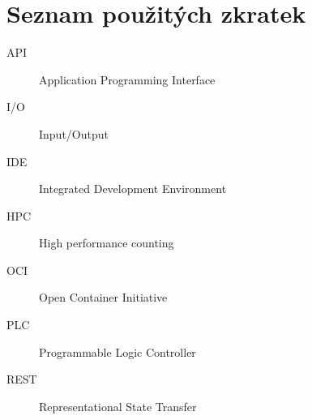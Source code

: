 \chapter{Seznam použitých zkratek}
\begin{description}
	\item[API] Application Programming Interface
	\item[I/O] Input/Output
	\item[IDE] Integrated Development Environment 
	\item[HPC] High performance counting
	\item[OCI] Open Container Initiative
	\item[PLC] Programmable Logic Controller
	\item[REST] Representational State Transfer
\end{description}